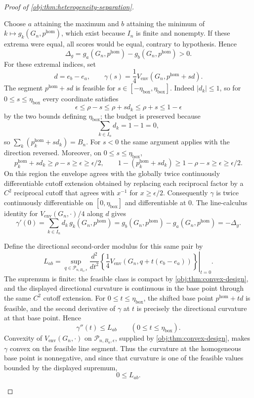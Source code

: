 \documentclass[11pt]{article}
\begin{document}
\begin{proof}[Proof of \cref{obj:thm:heterogeneity-separation}]
\begin{enumerate}
Choose \(a\) attaining the maximum and \(b\) attaining the minimum of
\(k\mapsto g_k(G_n,p^{\mathrm{hom}})\), which exist because \(I_n\) is finite and nonempty.  If these extrema were equal, all scores would be equal, contrary to hypothesis.  Hence
\[
\Delta_g
=g_a(G_n,p^{\mathrm{hom}})-g_b(G_n,p^{\mathrm{hom}})
>0.
\]
For these extremal indices, set
\[
d=e_b-e_a,
\qquad
\gamma(s)=\frac14V_{\mathrm{env}}(G_n,p^{\mathrm{hom}}+sd).
\]
The segment \(p^{\mathrm{hom}}+sd\) is feasible for \(s\in[-\eta_{\mathrm{box}},\eta_{\mathrm{box}}]\).  Indeed \(|d_k|\le1\), so for \(0\le s\le\eta_{\mathrm{box}}\) every coordinate satisfies
\[
\epsilon\le\rho-s\le\rho+sd_k\le\rho+s\le1-\epsilon
\]
by the two bounds defining \(\eta_{\mathrm{box}}\); the budget is preserved because
\[
\sum_{k\in I_n}d_k=1-1=0,
\]
so \(\sum_k(p^{\mathrm{hom}}_k+sd_k)=B_n\).  For \(s<0\) the same argument applies with the direction reversed.  Moreover, on \(0\le s\le\eta_{\mathrm{box}}\),
\[
p^{\mathrm{hom}}_k+sd_k\ge\rho-s\ge\epsilon\ge\epsilon/2,
\qquad
1-(p^{\mathrm{hom}}_k+sd_k)\ge1-\rho-s\ge\epsilon\ge\epsilon/2.
\]
On this region the envelope agrees with the globally twice continuously differentiable cutoff extension obtained by replacing each reciprocal factor by a \(C^2\) reciprocal cutoff that agrees with \(x^{-1}\) for \(x\ge\epsilon/2\).  Consequently \(\gamma\) is twice continuously differentiable on \([0,\eta_{\mathrm{box}}]\) and differentiable at \(0\).  The line-calculus identity for \(V_{\mathrm{env}}(G_n,\cdot)/4\) along \(d\) gives
\[
\gamma'(0)=\sum_{k\in I_n}d_k\,g_k(G_n,p^{\mathrm{hom}})
=g_b(G_n,p^{\mathrm{hom}})-g_a(G_n,p^{\mathrm{hom}})
=-\Delta_g.
\]

Define the directional second-order modulus for this same pair by
\[
L_{ab}
=
\sup_{q\in\mathcal P_{n,B_n,\epsilon}}
\left.
\frac{d^2}{dt^2}
\left\{\frac14V_{\mathrm{env}}(G_n,q+t(e_b-e_a))\right\}
\right|_{t=0}.
\]
The supremum is finite: the feasible class is compact by \cref{obj:thm:convex-design}, and the displayed directional curvature is continuous in the base point through the same \(C^2\) cutoff extension.  For \(0\le t\le\eta_{\mathrm{box}}\), the shifted base point \(p^{\mathrm{hom}}+td\) is feasible, and the second derivative of \(\gamma\) at \(t\) is precisely the directional curvature at that base point.  Hence
\[
\gamma''(t)\le L_{ab}
\qquad(0\le t\le\eta_{\mathrm{box}}).
\]
Convexity of \(V_{\mathrm{env}}(G_n,\cdot)\) on \(\mathcal P_{n,B_n,\epsilon}\), supplied by \cref{obj:thm:convex-design}, makes \(\gamma\) convex on the feasible line segment.  Thus the curvature at the homogeneous base point is nonnegative, and since that curvature is one of the feasible values bounded by the displayed supremum,
\[
0\le L_{ab}.
\]


\end{enumerate}
\end{proof}
\end{document}
